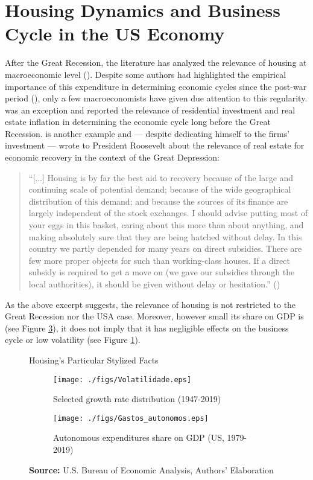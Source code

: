 \section{Housing Dynamics and Business Cycle in the US Economy}\label{sec:Stylized_Facts}

After the Great Recession, the literature has analyzed the relevance of housing at macroeconomic level (\cites{leamer_housing_2015}{teixeira_crescimento_2015}{fiebiger_semi-autonomous_2018}).
Despite some authors had highlighted the empirical importance of this expenditure in determining economic cycles since the post-war period (\cites{grebler_capital_1956}{green_follow_1997}{leamer_housing_2007}), only a few macroeconomists have given due attention to this regularity.
\textcite{duesenberry_investment_1958} was an exception and reported the relevance of residential investment and real estate inflation in
determining the economic cycle long before the Great Recession.
\textcite{keynes_collected_1978} is another example and --- despite dedicating himself to the firms' investment --- wrote to President Roosevelt about the relevance of real estate for economic recovery in the context of the Great Depression:


\begin{quotation}
    ``[...] Housing is by far the best aid to recovery because of the large and continuing scale
of potential demand; because of the wide geographical distribution of this demand; and
because the sources of its finance are largely independent of the stock exchanges. I should
advise putting most of your eggs in this basket, caring about this more than about anything,
and making absolutely sure that they are being hatched without delay. In this country we
partly depended for many years on direct subsidies. There are few more proper objects for
such than working-class houses. If a direct subsidy is required to get a move on (we gave
our subsidies through the local authorities), it should be given without delay or hesitation.''
(\cite[p.~436]{keynes_collected_1978})
\end{quotation}
As the above excerpt suggests, the relevance of housing is not restricted to the Great Recession nor the USA case.
Moreover, however small its share on GDP is (see Figure \ref{FigAutonomos}), it does not imply that it has negligible effects on the business cycle or low volatility (see Figure \ref{FigVolatilidade}).

\begin{figure}[H]
	\caption{Housing's Particular Stylized Facts}
	\label{fig:figs}
	\begin{subfigure}[t]{.5\textwidth}
		\centering
		\caption{Selected growth rate distribution (1947-2019)}
		\label{FigVolatilidade}
		\texttt{[image: ./figs/Volatilidade.eps]}
	\end{subfigure}
	\begin{subfigure}[t]{.5\textwidth}
		\centering
		\caption{Autonomous expenditures share on GDP (US, 1979-2019)}
		\label{FigAutonomos}
		\texttt{[image: ./figs/Gastos\_autonomos.eps]}  
	\end{subfigure}
	\caption*{\textbf{Source:} U.S. Bureau of Economic Analysis, Authors' Elaboration}
\end{figure}

